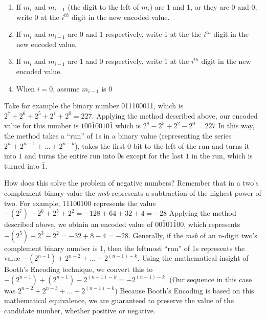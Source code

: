 \documentclass{article}
\begin{document}
\begin{enumerate}
\item If $m_i$ and $m_{i-1}$ (the digit to the left of $m_i$) are 1 and 1, or they are 0 and 0, write 0 at the $i^{th}$ digit in the new encoded value.
\item If $m_i$ and $m_{i-1}$ are 0 and 1 respectively, write 1 at the the $i^{th}$ digit in the new encoded value.
\item If $m_i$ and $m_{i-1}$ are 1 and 0 respectively, write $\bar{1}$ at the $i^{th}$ digit in the new encoded value.
\item When $i = 0$, assume $m_{i-1}$ is 0
\end{enumerate}

Take for example the binary number 011100011, which is $2^7 + 2^6 + 2^5 + 2^1 + 2^0 = 227$.
Applying the method described above, our encoded value for this number is $100\bar{1}0010\bar{1}$ which is $2^8 - 2^5 + 2^2 - 2^0 = 227$
In this way, the method takes a ``run'' of $1$s in a binary value (representing the series $2^{n} + 2^{n-1} + ...
+ 2^{n-k}$), takes the first 0 bit to the left of the run and turns it into $1$ and turns the entire run into $0$s except for the last $1$ in the run, which is turned into $\bar{1}$.

How does this solve the problem of negative numbers?
Remember that in a two's complement binary value the \emph{msb} represents a subtraction of the highest power of two.
For example, $11100100$ represents the value $-(2^{7}) + 2^{6} + 2^{5} + 2^{2} = -128 + 64 + 32 + 4 = -28$
Applying the method described above, we obtain an encoded value of $00\bar{1}01\bar{1}00$, which represents $-(2^{5}) + 2^{3} - 2^{2} = -32 + 8 - 4 = -28$.
Generally, if the \emph{msb} of an n-digit two's complement binary number is 1, then the leftmost ``run'' of $1$s represents the value $-(2^{n-1}) + 2^{n-2} + ...
+ 2^{(n-1)-k}$.
Using the mathematical insight of Booth's Encoding technique, we convert this to $-(2^{n-1}) + (2^{n-1}) - 2^{(n-1)-k} = -2^{(n-1)-k}$.
(Our sequence in this case was $2^{n-2} + 2^{n-3} + ...
+ 2^{(n-1)-k}$)
Because Booth's Encoding is based on this mathematical equivalence, we are guaranteed to preserve the value of the candidate number, whether positive or negative.
 
\end{document}
